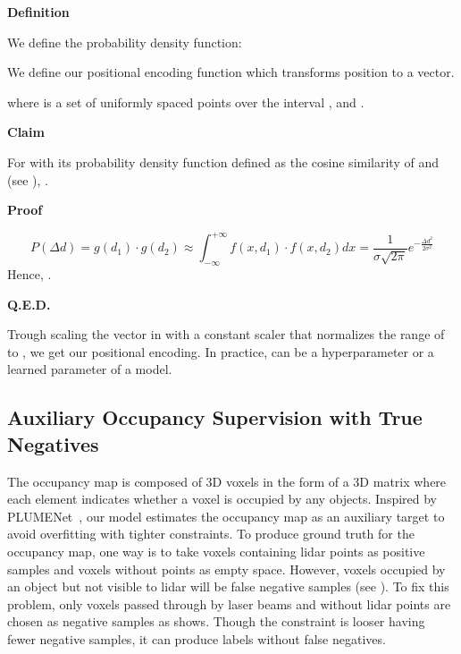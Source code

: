 \documentclass[10pt,twocolumn,letterpaper]{article}
\begin{document}
\begin{flushleft}
  \textbf{Definition} 
\end{flushleft}

We define the probability density function:



We define our positional encoding function  which transforms position  to a vector.



where  is a set of  uniformly spaced points over the interval ,  and .

\begin{flushleft}
  \textbf{Claim}
\end{flushleft}

For  with its probability density function defined as the cosine similarity of  and  (see ), .


\begin{flushleft}
  \textbf{Proof}
\end{flushleft}
\begin{dmath}
  P(\Delta d) = g(d_1) \cdot g(d_2) \approx \int ^{+\infty} _{-\infty} f(x, d_1) \cdot f(x, d_2) dx = \frac{1}{\sigma \sqrt{2 \pi}} e^{-\frac{{\Delta d}^2}{2 \sigma^2}}
\end{dmath}
Hence, .
\begin{flushleft}
  \textbf{Q.E.D.}
\end{flushleft}

Trough scaling the vector in  with a constant scaler  that normalizes the range of  to , we get our positional encoding. In practice,  can be a hyperparameter or a learned parameter of a model.

\subsection{Auxiliary Occupancy Supervision with True Negatives}
The occupancy map is composed of 3D voxels in the form of a 3D matrix where each element indicates whether a voxel is occupied by any objects. Inspired by PLUMENet~\cite{Wang2021PLUMENetE3}, our model estimates the occupancy map as an auxiliary target to avoid overfitting with tighter constraints. To produce ground truth for the occupancy map, one way is to take voxels containing lidar points as positive samples and voxels without points as empty space. However, voxels occupied by an object but not visible to lidar will be false negative samples (see ). To fix this problem, only voxels passed through by laser beams and without lidar points are chosen as negative samples as  shows. Though the constraint is looser having fewer negative samples, it can produce labels without false negatives.
\end{document}
